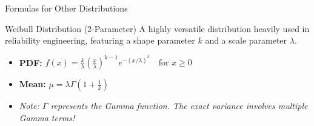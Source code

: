 \begin{frame}[allowframebreaks]{Formulas for Other Distributions}
    \vspace{0.2cm}
    \begin{block}{Weibull Distribution (2-Parameter)}
        A highly versatile distribution heavily used in reliability engineering, featuring a shape parameter $k$ and a scale parameter $\lambda$.
        \begin{itemize}
            \item \textbf{PDF:} $f(x) = \frac{k}{\lambda} \left(\frac{x}{\lambda}\right)^{k-1} e^{-(x/\lambda)^k} \quad \text{for } x \geq 0$
            \item \textbf{Mean:} $\mu = \lambda \Gamma\left(1 + \frac{1}{k}\right)$
            \item \textit{Note: $\Gamma$ represents the Gamma function. The exact variance involves multiple Gamma terms!}
        \end{itemize}
    \end{block}
\end{frame}

